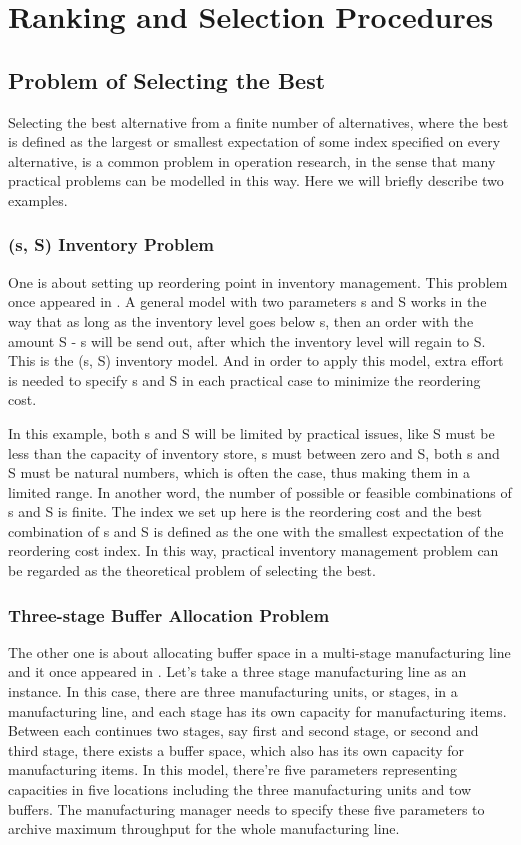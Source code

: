 \documentclass[12pt,a4paper]{report}
\begin{document}
\chapter{Ranking and Selection Procedures}

\section{Problem of Selecting the Best}

Selecting the best alternative from a finite number of alternatives, where the best is defined as the largest or smallest expectation of some index specified on every alternative, is a common problem in operation research, in the sense that many practical problems can be modelled in this way. Here we will briefly describe two examples.

\subsection{(s, S) Inventory Problem}

One is about setting up reordering point in inventory management. This problem once appeared in \cite{cissac1985ss}. A general model with two parameters s and S works in the way that as long as the inventory level goes below s, then an order with the amount S - s will be send out, after which the inventory level will regain to S. This is the (s, S) inventory model. And in order to apply this model, extra effort is needed to specify s and S in each practical case to minimize the reordering cost.

In this example, both s and S will be limited by practical issues, like S must be less than the capacity of inventory store, s must between zero and S, both s and S must be natural numbers, which is   often the case, thus making them in a limited range. In another word, the number of possible or feasible combinations of s and S is finite. The index we set up here is the reordering cost and the best combination of s and S is defined as the one with the smallest expectation of the reordering cost index. In this way, practical inventory management problem can be regarded as the theoretical problem of selecting the best.

\subsection{Three-stage Buffer Allocation Problem}

The other one is about allocating buffer space in a multi-stage manufacturing line and it once appeared in \cite{smoms93threestage}. Let's take a three stage manufacturing line as an instance. In this case, there are three manufacturing units, or stages, in a manufacturing line, and each stage has its own capacity for manufacturing items. Between each continues two stages, say first and second stage, or second and third stage, there exists a buffer space, which also has its own capacity for manufacturing items. In this model, there're five parameters representing capacities in five locations including the three manufacturing units and tow buffers. The manufacturing manager needs to specify these five parameters to archive maximum throughput for the whole manufacturing line.
\end{document}
